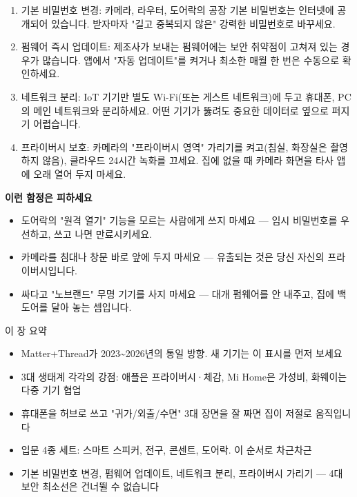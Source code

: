 \begin{enumerate}
  \item 기본 비밀번호 변경: 카메라, 라우터, 도어락의 공장 기본 비밀번호는 인터넷에 공개되어 있습니다. 받자마자 "길고 중복되지 않은" 강력한 비밀번호로 바꾸세요.
  \item 펌웨어 즉시 업데이트: 제조사가 보내는 펌웨어에는 보안 취약점이 고쳐져 있는 경우가 많습니다. 앱에서 "자동 업데이트"를 켜거나 최소한 매월 한 번은 수동으로 확인하세요.
  \item 네트워크 분리: IoT 기기만 별도 Wi-Fi(또는 게스트 네트워크)에 두고 휴대폰, PC의 메인 네트워크와 분리하세요. 어떤 기기가 뚫려도 중요한 데이터로 옆으로 퍼지기 어렵습니다.
  \item 프라이버시 보호: 카메라의 "프라이버시 영역" 가리기를 켜고(침실, 화장실은 촬영하지 않음), 클라우드 24시간 녹화를 끄세요. 집에 없을 때 카메라 화면을 타사 앱에 오래 열어 두지 마세요.
\end{enumerate}

\textbf{이런 함정은 피하세요}\par

\begin{itemize}
  \item 도어락의 "원격 열기" 기능을 모르는 사람에게 쓰지 마세요 — 임시 비밀번호를 우선하고, 쓰고 나면 만료시키세요.
  \item 카메라를 침대나 창문 바로 앞에 두지 마세요 — 유출되는 것은 당신 자신의 프라이버시입니다.
  \item 싸다고 "노브랜드" 무명 기기를 사지 마세요 — 대개 펌웨어를 안 내주고, 집에 백도어를 달아 놓는 셈입니다.
\end{itemize}

\begin{tcbsummary}{이 장 요약}
\begin{itemize}
  \item Matter+Thread가 2023\textasciitilde{}2026년의 통일 방향. 새 기기는 이 표시를 먼저 보세요
  \item 3대 생태계 각각의 강점: 애플은 프라이버시·체감, Mi Home은 가성비, 화웨이는 다중 기기 협업
  \item 휴대폰을 허브로 쓰고 "귀가/외출/수면" 3대 장면을 잘 짜면 집이 저절로 움직입니다
  \item 입문 4종 세트: 스마트 스피커, 전구, 콘센트, 도어락. 이 순서로 차근차근
  \item 기본 비밀번호 변경, 펌웨어 업데이트, 네트워크 분리, 프라이버시 가리기 — 4대 보안 최소선은 건너뛸 수 없습니다
\end{itemize}

\end{tcbsummary}
